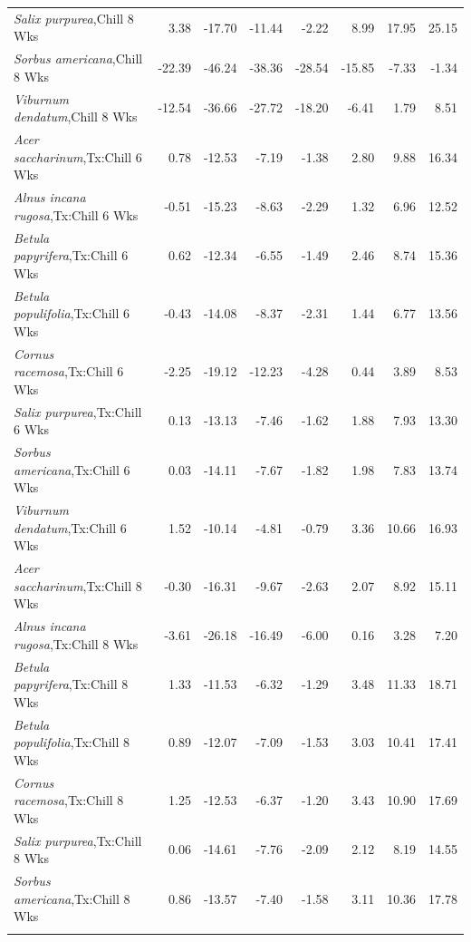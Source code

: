 \documentclass{article}\usepackage[]{graphicx}\usepackage[]{color}
\begin{document}
\begin{longtable}{lrrrrrrr}
  \textit{Salix purpurea},Chill 8 Wks & 3.38 & -17.70 & -11.44 & -2.22 & 8.99 & 17.95 & 25.15 \\ 
  \textit{Sorbus americana},Chill 8 Wks & -22.39 & -46.24 & -38.36 & -28.54 & -15.85 & -7.33 & -1.34 \\ 
  \textit{Viburnum dendatum},Chill 8 Wks & -12.54 & -36.66 & -27.72 & -18.20 & -6.41 & 1.79 & 8.51 \\ 
  \textit{Acer saccharinum},Tx:Chill 6 Wks & 0.78 & -12.53 & -7.19 & -1.38 & 2.80 & 9.88 & 16.34 \\ 
  \textit{Alnus incana rugosa},Tx:Chill 6 Wks & -0.51 & -15.23 & -8.63 & -2.29 & 1.32 & 6.96 & 12.52 \\ 
  \textit{Betula papyrifera},Tx:Chill 6 Wks & 0.62 & -12.34 & -6.55 & -1.49 & 2.46 & 8.74 & 15.36 \\ 
  \textit{Betula populifolia},Tx:Chill 6 Wks & -0.43 & -14.08 & -8.37 & -2.31 & 1.44 & 6.77 & 13.56 \\ 
  \textit{Cornus racemosa},Tx:Chill 6 Wks & -2.25 & -19.12 & -12.23 & -4.28 & 0.44 & 3.89 & 8.53 \\ 
  \textit{Salix purpurea},Tx:Chill 6 Wks & 0.13 & -13.13 & -7.46 & -1.62 & 1.88 & 7.93 & 13.30 \\ 
  \textit{Sorbus americana},Tx:Chill 6 Wks & 0.03 & -14.11 & -7.67 & -1.82 & 1.98 & 7.83 & 13.74 \\ 
  \textit{Viburnum dendatum},Tx:Chill 6 Wks & 1.52 & -10.14 & -4.81 & -0.79 & 3.36 & 10.66 & 16.93 \\ 
  \textit{Acer saccharinum},Tx:Chill 8 Wks & -0.30 & -16.31 & -9.67 & -2.63 & 2.07 & 8.92 & 15.11 \\ 
  \textit{Alnus incana rugosa},Tx:Chill 8 Wks & -3.61 & -26.18 & -16.49 & -6.00 & 0.16 & 3.28 & 7.20 \\ 
  \textit{Betula papyrifera},Tx:Chill 8 Wks & 1.33 & -11.53 & -6.32 & -1.29 & 3.48 & 11.33 & 18.71 \\ 
  \textit{Betula populifolia},Tx:Chill 8 Wks & 0.89 & -12.07 & -7.09 & -1.53 & 3.03 & 10.41 & 17.41 \\ 
  \textit{Cornus racemosa},Tx:Chill 8 Wks & 1.25 & -12.53 & -6.37 & -1.20 & 3.43 & 10.90 & 17.69 \\ 
  \textit{Salix purpurea},Tx:Chill 8 Wks & 0.06 & -14.61 & -7.76 & -2.09 & 2.12 & 8.19 & 14.55 \\ 
  \textit{Sorbus americana},Tx:Chill 8 Wks & 0.86 & -13.57 & -7.40 & -1.58 & 3.11 & 10.36 & 17.78 \\ 
   \hline
\hline
\label{tab:suppmodthick}
\end{longtable}
\end{document}
